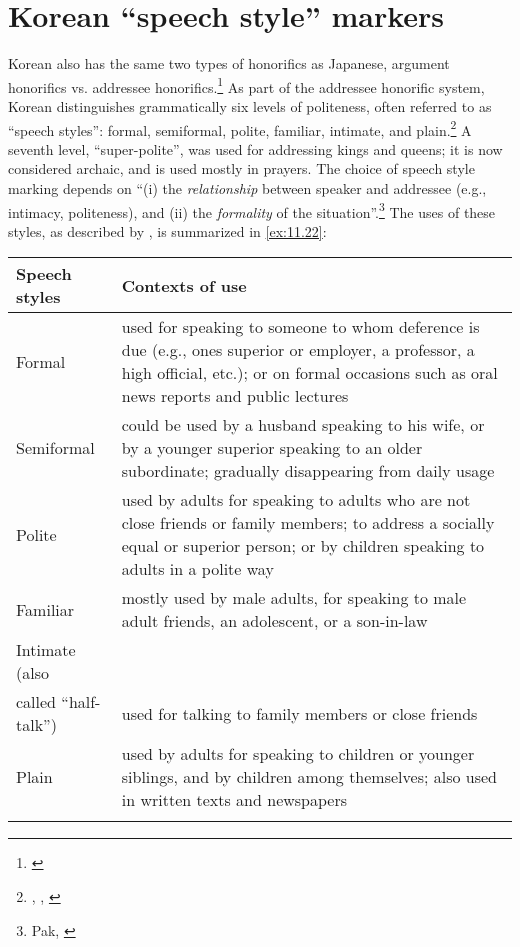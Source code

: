 \section{Korean “speech style” markers}\label{sec:11.4}

Korean also has the same two types of honorifics as Japanese, argument honorifics vs. addressee honorifics.\footnote{\citet{KimSells2007}} As part of the addressee honorific system, Korean distinguishes grammatically six levels of politeness, often referred to as “speech styles”: formal, semiformal, polite, familiar, intimate, and plain.\footnote{\citet{Martin1992}, \citet{Pak2008}, \citet{Sohn1999}} A seventh level, “super-polite”, was used for addressing kings and queens; it is now considered archaic, and is used mostly in prayers. The choice of speech style marking depends on “(i) the \textit{relationship} between speaker and addressee (e.g., intimacy, politeness), and (ii) the \textit{formality} of the situation”.\footnote{Pak, \citet{PortnerZanuttini2013}} The uses of these styles, as described by \citet[120]{Pak2008}, is summarized in \ref{ex:11.22}:

\ea \label{ex:11.22}
\begin{tabularx}{\textwidth}{lX}
\lsptoprule
 Speech styles & Contexts of use\\
 \midrule
 Formal & used for speaking to someone to whom deference is due (e.g., ones superior or employer, a professor, a high official, etc.); or on formal occasions such as oral news reports and public lectures\\
 Semiformal & could be used by a husband speaking to his wife, or by a younger superior speaking to an older subordinate; gradually disappearing from daily usage\\
 Polite & used by adults for speaking to adults who are not close friends or family members; to address a socially equal or superior person; or by children speaking to adults in a polite way\\
 Familiar & mostly used by male adults, for speaking to male adult friends, an adolescent, or a son-in-law\\
 Intimate (also\\
called “half-talk”) & used for talking to family members or close friends\\
 Plain & used by adults for speaking to children or younger siblings, and by children among themselves; also used in written texts and newspapers\\
\lspbottomrule
\end{tabularx}
\z

